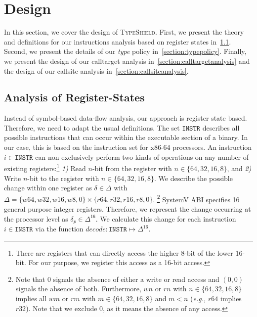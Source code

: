\section{Design}
\label{chapter:Design}

In this section, we cover the design of \textsc{TypeShield}. First, we present the theory and definitions for our instructions analysis based on register states 
in~\cref{section:instructionanalysis}. Second, we present the details of our \emph{type} policy in~\cref{section:typepolicy}. Finally, we present the design of 
our calltarget analysis in~\cref{section:calltargetanalysis} and the design of our callsite analysis in~\cref{section:callsiteanalysis}.

\subsection{Analysis of Register-States}
\label{section:instructionanalysis}
Instead of symbol-based data-flow analysis, our approach is register state based. Therefore, we need to adapt the usual definitions.
The set $\texttt{INSTR}$ describes all possible instructions that can occur within the executable section of a binary. In our case,
this is based on the instruction set for x86-64 processors. An instruction $i \in \texttt{INSTR}$ can non-exclusively perform two kinds of operations on any number of existing 
registers:\footnote{There are registers that can directly access the higher 
8-bit of the lower 16-bit. For our purpose, we register this access as a 16-bit access.}
\textit{1)} Read $n$-bit from the register with $n \in \{ 64, 32, 16, 8 \}$, and 
\textit{2)} Write $n$-bit to the register with $n \in \{ 64, 32, 16, 8 \}$.
We describe the possible change within one register as $\delta \in \Delta$ with $\Delta = \{ w64, w32, w16, w8, 0 \} \times \{r64, r32, r16, r8, 0 \}$. \footnote{Note that 0 signals 
the absence of either a write or read access and $(0, 0)$ signals the absence of both. Furthermore, $wn$ or $rn$ with $n \in \{64,32,16,8\}$ implies all $wm$ or $rm$ with $m \in 
\{64,32,16,8\}$ and $m < n$ (\textit{e.g.,} $r64$ implies $r32$). Note that we exclude 0, as it means the absence of any access.}
SystemV ABI specifies 16 general purpose integer registers. Therefore, we represent the change occurring at the processor level as $\delta_p \in \Delta^{16}$. We calculate this 
change for each instruction $i \in \texttt{INSTR}$ via the function $decode : \texttt{INSTR} \mapsto \Delta^{16}$.


